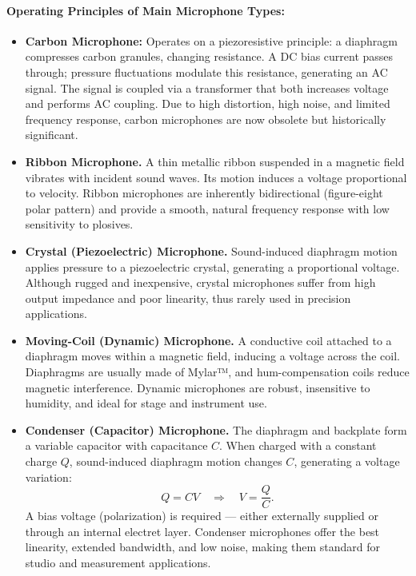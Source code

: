 \paragraph{Operating Principles of Main Microphone Types:}
\begin{itemize}
    \item \textbf{Carbon Microphone: }
Operates on a piezoresistive principle: a diaphragm compresses carbon granules, changing resistance. A DC bias current passes through; pressure fluctuations modulate this resistance, generating an AC signal.  
The signal is coupled via a transformer that both increases voltage and performs AC coupling.  
Due to high distortion, high noise, and limited frequency response, carbon microphones are now obsolete but historically significant.
\item \textbf{Ribbon Microphone.}
A thin metallic ribbon suspended in a magnetic field vibrates with incident sound waves. Its motion induces a voltage proportional to velocity. Ribbon microphones are inherently bidirectional (figure-eight polar pattern) and provide a smooth, natural frequency response with low sensitivity to plosives.
\item \textbf{Crystal (Piezoelectric) Microphone.}
Sound-induced diaphragm motion applies pressure to a piezoelectric crystal, generating a proportional voltage. Although rugged and inexpensive, crystal microphones suffer from high output impedance and poor linearity, thus rarely used in precision applications.
\item \textbf{Moving-Coil (Dynamic) Microphone.}
A conductive coil attached to a diaphragm moves within a magnetic field, inducing a voltage across the coil.  
Diaphragms are usually made of Mylar™, and hum-compensation coils reduce magnetic interference. Dynamic microphones are robust, insensitive to humidity, and ideal for stage and instrument use.
\item \textbf{Condenser (Capacitor) Microphone.}
The diaphragm and backplate form a variable capacitor with capacitance \(C\). When charged with a constant charge \(Q\),
sound-induced diaphragm motion changes \(C\), generating a voltage variation:
\[
Q = C V \quad \Rightarrow \quad V = \frac{Q}{C}.
\]
A bias voltage (polarization) is required — either externally supplied or through an internal electret layer.  
Condenser microphones offer the best linearity, extended bandwidth, and low noise, making them standard for studio and measurement applications.
\end{itemize}


